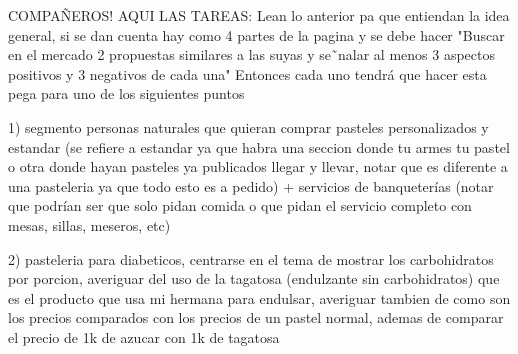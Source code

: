 \documentclass[preprintnumbers,superscriptaddress,amsmath,%
  amssymb,aps,reprint,nofootinbib]{revtex4-1}
\numberwithin{equation}{section}
\begin{document}
COMPAÑEROS! AQUI LAS TAREAS: Lean lo anterior pa que entiendan la idea general, si se dan cuenta hay como 4 partes de la pagina y se debe hacer "Buscar en el mercado 2 propuestas similares a las suyas y se˜nalar al menos 3 aspectos positivos
y 3 negativos de cada una" Entonces cada uno tendrá que hacer esta pega para uno de los siguientes puntos

1) segmento personas naturales que quieran comprar pasteles personalizados y estandar (se refiere a estandar ya que habra una seccion donde tu armes tu pastel o otra donde hayan pasteles ya publicados llegar y llevar, notar que es diferente a una pasteleria ya que todo esto es a pedido) + servicios de banqueterías (notar que podrían ser que solo pidan comida o que pidan el servicio completo con mesas, sillas, meseros, etc)


2) pasteleria para diabeticos, centrarse en el tema de mostrar los carbohidratos por porcion, averiguar del uso de la tagatosa (endulzante sin carbohidratos) que es el producto que usa mi hermana para endulsar, averiguar tambien de como son los precios comparados con los precios de un pastel normal, ademas de comparar el precio de 1k de azucar con 1k de tagatosa
\end{document}
